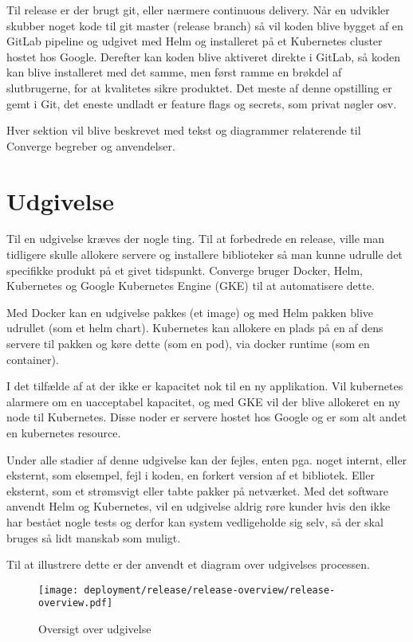 Til release er der brugt git, eller nærmere continuous delivery. Når en udvikler skubber noget kode til git master (release branch) så vil koden blive bygget af en GitLab pipeline og udgivet med Helm og installeret på et Kubernetes cluster hostet hos Google. Derefter kan koden blive aktiveret direkte i GitLab, så koden kan blive installeret med det samme, men først ramme en brøkdel af slutbrugerne, for at kvalitetes sikre produktet. Det meste af denne opstilling er gemt i Git, det eneste undladt er feature flags \cite{documentation_terms} og secrets, som privat nøgler osv.

Hver sektion vil blive beskrevet med tekst og diagrammer relaterende til Converge begreber og anvendelser.

\section{Udgivelse}

Til en udgivelse kræves der nogle ting. Til at forbedrede en release, ville man tidligere skulle allokere servere og installere biblioteker så man kunne udrulle det specifikke produkt på et givet tidspunkt. Converge bruger Docker, Helm, Kubernetes og Google Kubernetes Engine (GKE) til at automatisere dette.

Med Docker kan en udgivelse pakkes (et image) og med Helm pakken blive udrullet (som et helm chart). Kubernetes kan allokere en plads på en af dens servere til pakken og køre dette (som en pod), via docker runtime (som en container).

I det tilfælde af at der ikke er kapacitet nok til en ny applikation. Vil kubernetes alarmere om en uacceptabel kapacitet, og med GKE vil der blive allokeret en ny node til Kubernetes. Disse noder er servere hostet hos Google og er som alt andet en kubernetes resource.

Under alle stadier af denne udgivelse kan der fejles, enten pga. noget internt, eller eksternt, som eksempel, fejl i koden, en forkert version af et bibliotek. Eller eksternt, som et strømsvigt eller tabte pakker på netværket. Med det software anvendt Helm og Kubernetes, vil en udgivelse aldrig røre kunder hvis den ikke har bestået nogle tests og derfor kan system vedligeholde sig selv, så der skal bruges så lidt manskab som muligt.

Til at illustrere dette er der anvendt et diagram over udgivelses processen.

\begin{figure}[H]
    \begin{small}
        \begin{center}
            \texttt{[image: deployment/release/release-overview/release-overview.pdf]}
        \end{center}
        \caption{Oversigt over udgivelse}
        \label{fig:release-overview}
    \end{small}
\end{figure}

